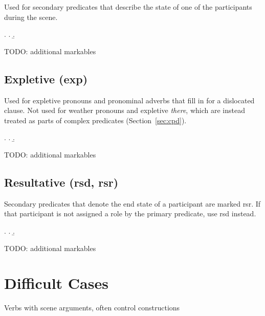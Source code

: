 \documentclass[a4paper]{article}
\begin{document}
Used for secondary predicates that describe the state of one of the participants during the scene.

\ex.
\a. 
\b. 

TODO: additional markables


\clearpage
\subsection{Expletive (\textsf{exp})}
\label{sec:exp}

Used for expletive pronouns and pronominal adverbs that fill in for a
dislocated clause. Not used for weather pronouns and expletive \emph{there},
which are instead treated as parts of complex predicates
(Section~\ref{sec:cpd}).

\ex.
\a. 
\b. 

TODO: additional markables


\clearpage
\subsection{Resultative (\textsf{rsd}, \textsf{rsr})}
\label{sec:rsd}\label{sec:rsr}

Secondary predicates that denote the end state of a participant are marked
\textsf{rsr}. If that participant is not assigned a role by the primary
predicate, use \textsf{rsd} instead.

\ex.
\a. 
\b. 

TODO: additional markables

\appendix


\clearpage
\section{Difficult Cases}

Verbs with scene arguments, often control constructions
\end{document}
